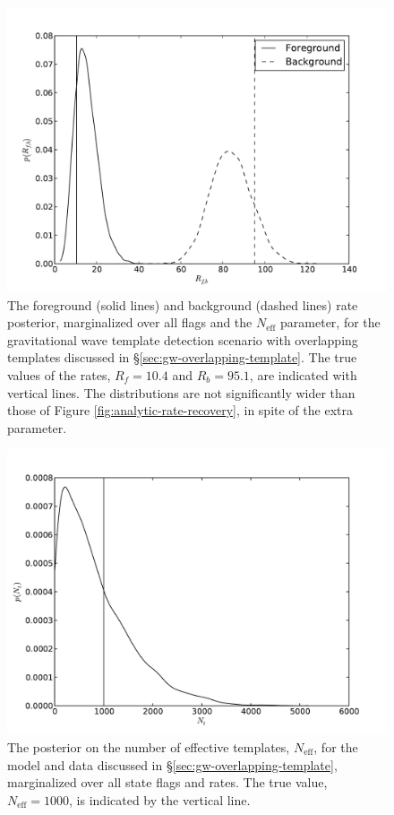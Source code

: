 \documentclass[aps,prd,reprint,nofootinbib]{revtex4-1}
\begin{document}
\begin{figure}
  \includegraphics[width=\columnwidth]{rates-nt}
  \caption{\label{fig:rates-nt} The foreground (solid lines) and
    background (dashed lines) rate posterior, marginalized over all
    flags and the $N_\mathrm{eff}$ parameter, for the gravitational
    wave template detection scenario with overlapping templates
    discussed in \S \ref{sec:gw-overlapping-template}.  The true
    values of the rates, $R_f = 10.4$ and $R_b=95.1$, are indicated
    with vertical lines.  The distributions are not significantly
    wider than those of Figure \ref{fig:analytic-rate-recovery}, in
    spite of the extra parameter.}
\end{figure}

\begin{figure}
  \includegraphics[width=\columnwidth]{ntemplates}
  \caption{\label{fig:ntemplates} The posterior on the number of
    effective templates, $N_\mathrm{eff}$, for the model and data
    discussed in \S \ref{sec:gw-overlapping-template}, marginalized
    over all state flags and rates.  The true value, $N_\mathrm{eff} =
    1000$, is indicated by the vertical line.}
\end{figure}
\end{document}
